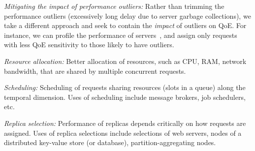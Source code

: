\begin{packeditemize}
\item{\em Mitigating the impact of performance outliers:} 
Rather than trimming the performance outliers (excessively long delay due to \eg server garbage collections), we take a different approach and seek to contain the {\em impact} of outliers on QoE.
For instance, we can profile the performance of servers~\cite{yadwadkar2014wrangler}, and assign only requests with less QoE sensitivity to those likely to have outliers. 
    
\end{packeditemize}

\begin{packeditemize}

\item {\em Resource allocation:} 
Better allocation of resources, such as CPU, RAM, network bandwidth, that are shared by multiple concurrent requests. 

\item {\em Scheduling:}
Scheduling of requests sharing resources (\eg slots in a queue) along the temporal dimension.
Uses of scheduling include message brokers, job schedulers, etc.

\item {\em Replica selection:}
Performance of replicas depends critically on how requests are assigned.
Uses of replica selections include selections of web servers, nodes of a distributed key-value store (or database), partition-aggregating nodes.

\end{packeditemize}






